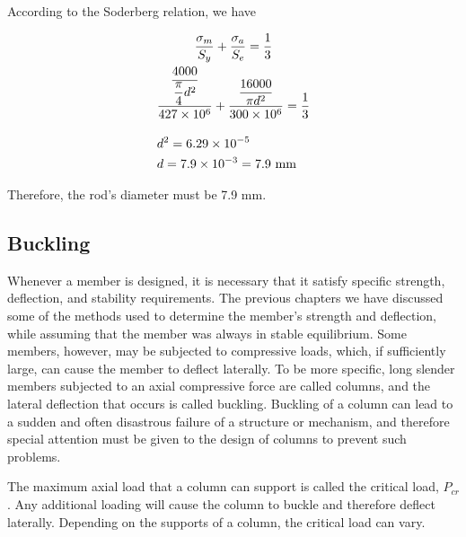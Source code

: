 \documentclass[a4paper,openany,nobib]{tufte-book}
\begin{document}
{{According to the Soderberg relation, we have

\begin{gather}
    \frac{\sigma_m}{S_y} + \frac{\sigma _a}{S_e} = \frac{1}{3} \\ 
    \dfrac{\dfrac{4000}{\dfrac{\pi }{4}d^2}}{427 \times 10^6} + \dfrac{\dfrac{16000}{\pi d^2}}{300 \times 10^6} = \frac{1}{3} \\[1em] 
    d^2 = 6.29 \times 10^{-5} \hfill \\
    d = 7.9 \times 10^{-3} = 7.9 \text{ mm} \hfill \\ 
\end{gather}

Therefore, the rod's diameter must be 7.9 mm.

\subsection{Buckling}
\label{section: buckling}
Whenever a member is designed, it is necessary that it satisfy specific
strength, deflection, and stability requirements. The previous chapters
we have discussed some of the methods used to determine the member's
strength and deflection, while assuming that the member was always in
stable equilibrium. Some members, however, may be subjected to
compressive loads, which, if sufficiently large, can cause the member to
deflect laterally. To be more specific, long slender members subjected
to an axial compressive force are called columns, and the lateral
deflection that occurs is called buckling. Buckling of a column can lead
to a sudden and often disastrous failure of a structure or mechanism,
and therefore special attention must be given to the design of columns
to prevent such problems.

The maximum axial load that a column can support is called the critical
load, \(P_{cr}\). Any additional loading will cause the column to buckle
and therefore deflect laterally. Depending on the supports of a column,
the critical load can vary.

}}
\end{document}
